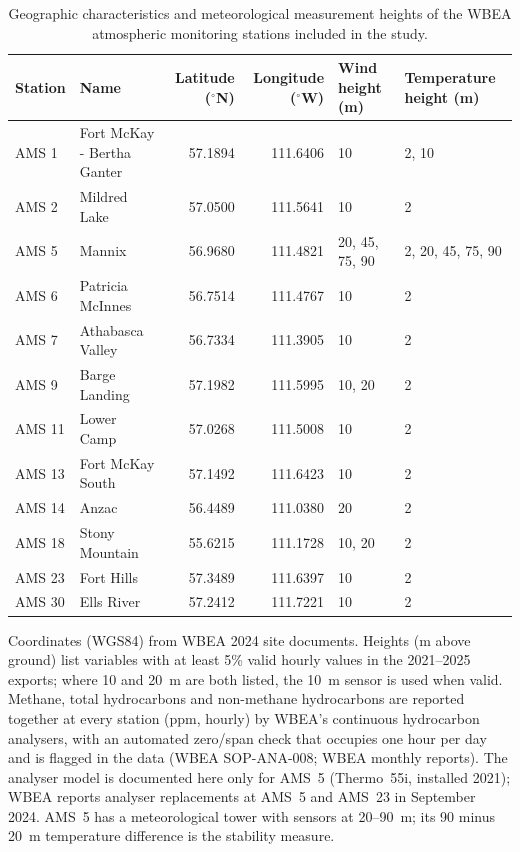 \begin{table}[t]
\centering
\caption{Geographic characteristics and meteorological measurement heights of the WBEA atmospheric monitoring stations included in the study.}
\label{tab:stations}
\begin{tabular*}{\textwidth}{@{\extracolsep{\fill}}llrrll@{}}
\toprule
Station & Name & Latitude ($^\circ$N) & Longitude ($^\circ$W) & Wind height (m) & Temperature height (m) \\
\midrule
AMS 1 & Fort McKay - Bertha Ganter & 57.1894 & 111.6406 & 10 & 2, 10 \\
AMS 2 & Mildred Lake & 57.0500 & 111.5641 & 10 & 2 \\
AMS 5 & Mannix & 56.9680 & 111.4821 & 20, 45, 75, 90 & 2, 20, 45, 75, 90 \\
AMS 6 & Patricia McInnes & 56.7514 & 111.4767 & 10 & 2 \\
AMS 7 & Athabasca Valley & 56.7334 & 111.3905 & 10 & 2 \\
AMS 9 & Barge Landing & 57.1982 & 111.5995 & 10, 20 & 2 \\
AMS 11 & Lower Camp & 57.0268 & 111.5008 & 10 & 2 \\
AMS 13 & Fort McKay South & 57.1492 & 111.6423 & 10 & 2 \\
AMS 14 & Anzac & 56.4489 & 111.0380 & 20 & 2 \\
AMS 18 & Stony Mountain & 55.6215 & 111.1728 & 10, 20 & 2 \\
AMS 23 & Fort Hills & 57.3489 & 111.6397 & 10 & 2 \\
AMS 30 & Ells River & 57.2412 & 111.7221 & 10 & 2 \\
\bottomrule
\end{tabular*}
\par\smallskip\begin{minipage}{\textwidth}\footnotesize
Coordinates (WGS84) from WBEA 2024 site documents. Heights (m above ground) list variables with at least 5\% valid hourly values in the 2021--2025 exports; where 10 and 20~m are both listed, the 10~m sensor is used when valid. Methane, total hydrocarbons and non-methane hydrocarbons are reported together at every station (ppm, hourly) by WBEA's continuous hydrocarbon analysers, with an automated zero/span check that occupies one hour per day and is flagged in the data (WBEA SOP-ANA-008; WBEA monthly reports). The analyser model is documented here only for AMS~5 (Thermo~55i, installed 2021); WBEA reports analyser replacements at AMS~5 and AMS~23 in September 2024. AMS~5 has a meteorological tower with sensors at 20--90~m; its 90 minus 20~m temperature difference is the stability measure.
\end{minipage}
\end{table}
